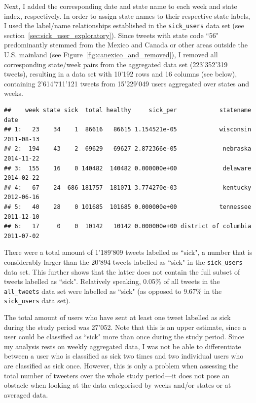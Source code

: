 \documentclass[11pt, a4paper,twoside]{report}\usepackage[]{graphicx}\usepackage[]{color}
\makeatletter
\newenvironment{kframe}{%
 \def\at@end@of@kframe{}%
 \ifinner\ifhmode%
  \def\at@end@of@kframe{\end{minipage}}%
  \begin{minipage}{\columnwidth}%
 \fi\fi%
 \def\FrameCommand##1{\hskip\@totalleftmargin \hskip-\fboxsep
 \colorbox{shadecolor}{##1}\hskip-\fboxsep
     \hskip-\linewidth \hskip-\@totalleftmargin \hskip\columnwidth}%
 \MakeFramed {\advance\hsize-\width
   \@totalleftmargin\z@ \linewidth\hsize
   \@setminipage}}%
 {\par\unskip\endMakeFramed%
 \at@end@of@kframe}
\newenvironment{knitrout}{}{} %
\makeatother
\begin{document}
Next, I added the corresponding date and state name to each week and state index, respectively. In order to assign state names to their respective state labels, I used the label/name relationships established in the \texttt{sick\_users} data set (see section~\ref{sec:sick_user_exploratory}). Since tweets with state code ``56" predominantly stemmed from the Mexico and Canada or other areas outside the U.S. mainland (see Figure~\ref{fig:canexico_and_removed}), I removed all corresponding state/week pairs from the aggregated data set (223'352'319 tweets), resulting in a data set with 10'192 rows and 16 columns (see below), containing 2'614'711'121 tweets from 15'229'049 users aggregated over states and weeks.

\begin{knitrout}
\color{fgcolor}\begin{kframe}
\begin{verbatim}
##    week state sick  total healthy     sick_per            statename       date
## 1:   23    34    1  86616   86615 1.154521e-05            wisconsin 2011-08-13
## 2:  194    43    2  69629   69627 2.872366e-05             nebraska 2014-11-22
## 3:  155    16    0 140482  140482 0.000000e+00             delaware 2014-02-22
## 4:   67    24  686 181757  181071 3.774270e-03             kentucky 2012-06-16
## 5:   40    28    0 101685  101685 0.000000e+00            tennessee 2011-12-10
## 6:   17     0    0  10142   10142 0.000000e+00 district of columbia 2011-07-02
\end{verbatim}
\end{kframe}
\end{knitrout}

There were a total amount of 1'189'809 tweets labelled as ``sick", a number that is considerably larger than the 20'894 tweets labelled as ``sick" in the \texttt{sick\_users} data set. This further shows that the latter does not contain the full subset of tweets labelled as ``sick". Relatively speaking, 0.05\% of all tweets in the \texttt{all\_tweets} data set were labelled as ``sick" (as opposed to 9.67\% in the \texttt{sick\_users} data set).

The total amount of users who have sent at least one tweet labelled as sick during the study period was 27'052. Note that this is an upper estimate, since a user could be classified as ``sick" more than once during the study period. Since my analysis rests on weekly aggregated data, I was not be able to differentiate between a user who is classified as sick two times and two individual users who are classified as sick once. However, this is only a problem when assessing the total number of tweeters over the whole study period---it does not pose an obstacle when looking at the data categorised by weeks and/or states or at averaged data.
\end{document}
